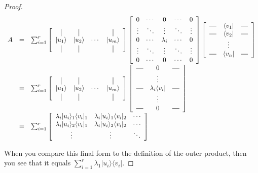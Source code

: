 \documentclass{amsbook}
\newcommand*{\vertbar}{\rule[-1ex]{0.5pt}{2.5ex}}
\newcommand*{\horzbar}{\rule[.5ex]{2.5ex}{0.5pt}}
\begin{document}
\begin{proof}
$$
\begin{array}{rcl}
A &=& \sum_{i=1}^r\left[
  \begin{array}{cccc}
    \vertbar & \vertbar & & \vertbar \\
    | u _1\rangle    & | u _2\rangle   & \cdots & | u _m\rangle    \\
    \vertbar & \vertbar & & \vertbar 
  \end{array}
\right] \left[\begin{array}{ccccc}
0 & \cdots & 0 & \cdots & 0 \\
\vdots & \ddots & \vdots & \ddots & \vdots \\
0 & \cdots & \lambda_i & \cdots & 0 \\
\vdots & \ddots & \vdots & \ddots & \vdots \\
0 & \cdots & 0 & \cdots & 0 \\
\end{array}\right]\left[
  \begin{array}{ccc}
    \horzbar & \langle v _1| & \horzbar \\
    \horzbar & \langle v _2|& \horzbar \\
             & \vdots    &          \\
    \horzbar & \langle v _n|& \horzbar
  \end{array}
\right] \\
&=& \sum_{i=1}^r\left[
  \begin{array}{cccc}
    \vertbar & \vertbar & & \vertbar \\
    | u _1\rangle    & | u _2\rangle   & \cdots & | u _m\rangle    \\
    \vertbar & \vertbar & & \vertbar 
  \end{array}
\right] \left[
  \begin{array}{ccc}
    \horzbar & 0 & \horzbar \\
             & \vdots    &          \\
    \horzbar & \lambda_i\langle v _i|& \horzbar \\
             & \vdots    &          \\
    \horzbar & 0& \horzbar
  \end{array}
\right] \\
&=& \sum_{i=1}^r\left[
  \begin{array}{ccc}
  \lambda_i| u _i\rangle_1\langle v _i|_1 & \lambda_i| u _i\rangle_1\langle v _i|_2 & \cdots \\
  \lambda_i| u _i\rangle_2\langle v _i|_1 & \lambda_i| u _i\rangle_2\langle v _i|_2 & \cdots \\
  \vdots & \vdots & \ddots
  \end{array}
\right] 
\end{array}
$$

\noindent
When you compare this final form to the definition of the outer product, then you see that it equals $\sum_{i=1}^r\lambda_1| u _i\rangle\langle v _i|$.
\end{proof}
\end{document}
